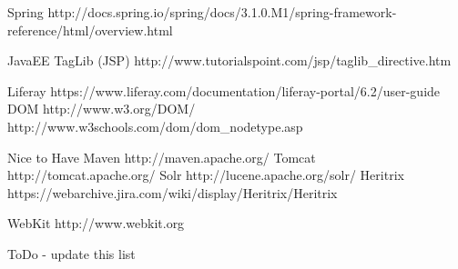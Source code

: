 \begin{DoxyVerb}
Spring      http://docs.spring.io/spring/docs/3.1.0.M1/spring-framework-reference/html/overview.html 

JavaEE
    TagLib (JSP)    http://www.tutorialspoint.com/jsp/taglib_directive.htm 

Liferay https://www.liferay.com/documentation/liferay-portal/6.2/user-guide 
DOM     http://www.w3.org/DOM/   http://www.w3schools.com/dom/dom_nodetype.asp 


Nice to Have
Maven       http://maven.apache.org/ 
Tomcat      http://tomcat.apache.org/ 
Solr        http://lucene.apache.org/solr/
Heritrix    https://webarchive.jira.com/wiki/display/Heritrix/Heritrix 

WebKit http://www.webkit.org
\end{DoxyVerb}


To\+Do -\/ update this list 